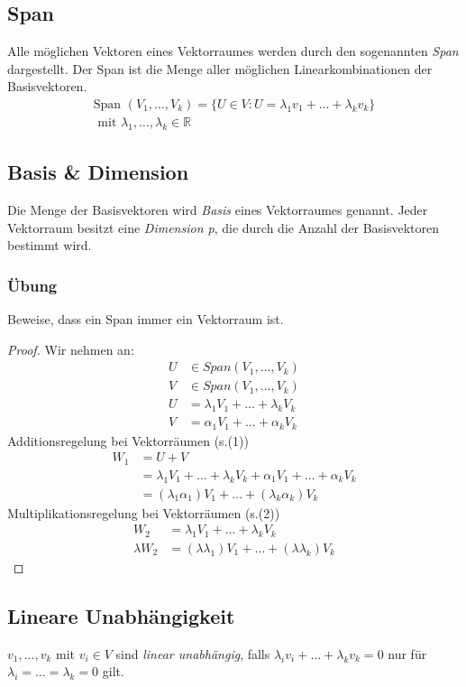 \subsection{Span}
Alle m\"oglichen Vektoren eines Vektorraumes werden durch den sogenannten \textit{Span} dargestellt. Der Span ist die Menge aller m\"oglichen Linearkombinationen der Basisvektoren.
\begin{align*}
\text{Span }(V_1,\dots,V_k) = \{U \in V : U = \lambda_1v_1+\dots+\lambda_kv_k\} \\
\text{ mit } \lambda_1,\dots,\lambda_k \in \mathbb{R}
\end{align*}
\subsection{Basis \& Dimension}
Die Menge der Basisvektoren wird \textit{Basis} eines Vektorraumes genannt. Jeder Vektorraum besitzt eine \textit{Dimension p}, die durch die Anzahl der Basisvektoren bestimmt wird.
\subsubsection*{\"Ubung}
Beweise, dass ein Span immer ein Vektorraum ist.
\begin{proof}
Wir nehmen an: 
\begin{align*}
U &\in Span(V_1,\dots,V_k)\\
V &\in Span(V_1,\dots,V_k)\\
U &= \lambda_1V_1+\dots+\lambda_k V_k\\
V &= \alpha_1V_1+\dots+\alpha_k V_k
\end{align*}
Additionsregelung bei Vektorr\"aumen (s.(1))
\begin{align*}
	W_1 &= U+V\\
	&=\lambda_1 V_1+\dots+\lambda_k V_k+\alpha_1 V_1+\dots+\alpha_k V_k \\
	&= (\lambda_1 \alpha_1) V_1+\dots+(\lambda_k \alpha_k) V_k
\end{align*}
Multiplikationsregelung bei Vektorr\"aumen (s.(2))
\begin{align*}
	W_2 &= \lambda_1 V_1+\dots+\lambda_k V_k\\
	\lambda W_2 &= (\lambda \lambda_1) V_1+\dots+(\lambda\lambda_k)V_k
\end{align*}
\end{proof}
\subsection{Lineare Unabh\"angigkeit}
$v_1,\dots,v_k$ mit $v_i \in V$ sind \textit{linear unabh\"angig}, falls $\lambda_iv_i+\dots+\lambda_kv_k = 0$ nur f\"ur $\lambda_i=\dots=\lambda_k= 0$ gilt. 

%
